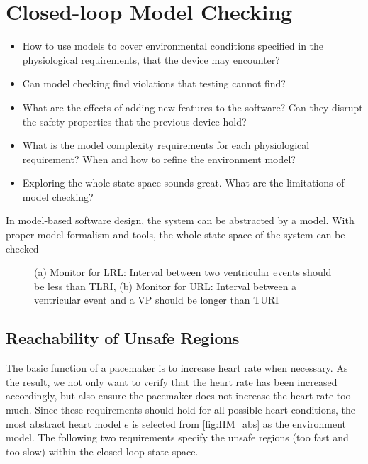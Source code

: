\chapter{Closed-loop Model Checking}
\begin{itemize}
	\item How to use models to cover environmental conditions specified in the physiological requirements, that the device may encounter?
            \item Can model checking find violations that testing cannot find?
            \item What are the effects of adding new features to the software? Can they disrupt the safety properties that the previous device hold?
            \item What is the model complexity requirements for each physiological requirement? When and how to refine the environment model?
            \item Exploring the whole state space sounds great. What are the limitations of model checking? 
\end{itemize}
In model-based software design, the system can be abstracted by a model. With proper model formalism and tools, the whole state space of the system can be checked
\begin{figure}
\centering
	\caption{(a) Monitor for LRL: Interval between two ventricular events should be less than TLRI, (b) Monitor for URL: Interval between a ventricular event and a VP should be longer than TURI}
\end{figure} 
\section{Reachability of Unsafe Regions}
The basic function of a pacemaker is to increase heart rate when necessary. As the result, we not only want to verify that the heart rate has been increased accordingly, but also ensure the pacemaker does not increase the heart rate too much. Since these requirements should hold for all possible heart conditions, the most abstract heart model $e$ is selected from \ref{fig:HM_abs} as the environment model. The following two requirements specify the unsafe regions  (too fast and too slow) within the closed-loop state space.

